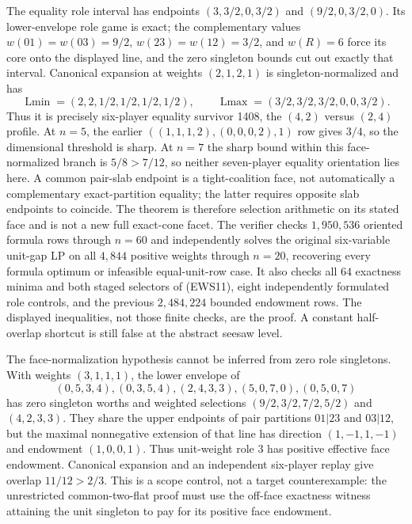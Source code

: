 \documentclass[11pt]{article}
\newcommand{\Lmin}{\operatorname{Lmin}}
\newcommand{\Lmax}{\operatorname{Lmax}}
\begin{document}
The equality role interval has endpoints
$(3,3/2,0,3/2)$ and $(9/2,0,3/2,0)$.  Its lower-envelope role game is exact;
the complementary values
$w(01)=w(03)=9/2$, $w(23)=w(12)=3/2$, and $w(R)=6$ force its
core onto the displayed line, and the zero singleton bounds cut out exactly
that interval.  Canonical expansion at weights $(2,1,2,1)$ is
singleton-normalized and has
\[
 \Lmin=(2,2,1/2,1/2,1/2,1/2),\qquad
 \Lmax=(3/2,3/2,3/2,0,0,3/2).                           \tag{EWS11}
\]
Thus it is precisely six-player equality survivor 1408, the $(4,2)$ versus
$(2,4)$ profile.  At $n=5$, the earlier
$((1,1,1,2),(0,0,0,2),1)$ row gives $3/4$, so the dimensional threshold is
sharp.  At $n=7$ the sharp bound within this face-normalized branch is
$5/8>7/12$, so neither seven-player equality orientation lies here.  A
common pair-slab endpoint is a tight-coalition face, not automatically a
complementary exact-partition equality; the latter requires opposite slab
endpoints to coincide.  The theorem is therefore selection arithmetic on
its stated face and is not a new full exact-cone facet.  The verifier checks
$1{,}950{,}536$ oriented formula rows through $n=60$ and independently solves
the original six-variable unit-gap LP on all $4{,}844$ positive weights
through $n=20$, recovering every formula optimum or infeasible equal-unit-row
case.  It also checks all $64$ exactness minima and both staged selectors of
(EWS11), eight independently formulated role controls, and the previous
$2{,}484{,}224$ bounded endowment rows.  The displayed inequalities, not
those finite checks, are the proof.  A constant
half-overlap shortcut is still false at the abstract seesaw level.

The face-normalization hypothesis cannot be inferred from zero role
singletons.  With weights $(3,1,1,1)$, the lower envelope of
\[
 (0,5,3,4),(0,3,5,4),(2,4,3,3),(5,0,7,0),(0,5,0,7)
\]
has zero singleton worths and weighted selections
$(9/2,3/2,7/2,5/2)$ and $(4,2,3,3)$.  They share the upper endpoints of
pair partitions $01|23$ and $03|12$, but the maximal nonnegative extension
of that line has direction $(1,-1,1,-1)$ and endowment $(1,0,0,1)$.
Thus unit-weight role $3$ has positive effective face endowment.  Canonical
expansion and an independent six-player replay give overlap $11/12>2/3$.
This is a scope control, not a target counterexample: the unrestricted
common-two-flat proof must use the off-face exactness witness attaining the
unit singleton to pay for its positive face endowment.
\end{document}
